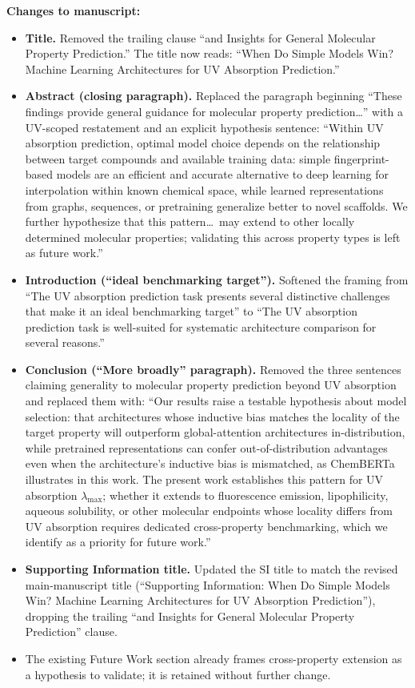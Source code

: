 \documentclass[11pt]{article}
\newenvironment{changes}{%
  \noindent\textbf{Changes to manuscript:}
  \begin{itemize}[leftmargin=2em,itemsep=2pt]}{%
  \end{itemize}\medskip}
\begin{document}
\begin{changes}
  \item \textbf{Title.} Removed the trailing clause ``and Insights for General Molecular Property Prediction.'' The title now reads: ``When Do Simple Models Win? Machine Learning Architectures for UV Absorption Prediction.''
  \item \textbf{Abstract (closing paragraph).} Replaced the paragraph beginning ``These findings provide general guidance for molecular property prediction\ldots'' with a UV-scoped restatement and an explicit hypothesis sentence: ``Within UV absorption prediction, optimal model choice depends on the relationship between target compounds and available training data: simple fingerprint-based models are an efficient and accurate alternative to deep learning for interpolation within known chemical space, while learned representations from graphs, sequences, or pretraining generalize better to novel scaffolds. We further hypothesize that this pattern\ldots\ may extend to other locally determined molecular properties; validating this across property types is left as future work.''
  \item \textbf{Introduction (``ideal benchmarking target'').} Softened the framing from ``The UV absorption prediction task presents several distinctive challenges that make it an ideal benchmarking target'' to ``The UV absorption prediction task is well-suited for systematic architecture comparison for several reasons.''
  \item \textbf{Conclusion (``More broadly'' paragraph).} Removed the three sentences claiming generality to molecular property prediction beyond UV absorption and replaced them with: ``Our results raise a testable hypothesis about model selection: that architectures whose inductive bias matches the locality of the target property will outperform global-attention architectures in-distribution, while pretrained representations can confer out-of-distribution advantages even when the architecture's inductive bias is mismatched, as ChemBERTa illustrates in this work. The present work establishes this pattern for UV absorption $\lambda_{\max}$; whether it extends to fluorescence emission, lipophilicity, aqueous solubility, or other molecular endpoints whose locality differs from UV absorption requires dedicated cross-property benchmarking, which we identify as a priority for future work.''
  \item \textbf{Supporting Information title.} Updated the SI title to match the revised main-manuscript title (``Supporting Information: When Do Simple Models Win? Machine Learning Architectures for UV Absorption Prediction''), dropping the trailing ``and Insights for General Molecular Property Prediction'' clause.
  \item The existing Future Work section already frames cross-property extension as a hypothesis to validate; it is retained without further change.
\end{changes}
\end{document}

